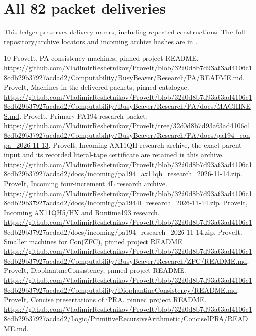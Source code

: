 \documentclass[10pt,letterpaper]{article}
\newcommand{\file}[1]{\path{#1}}
\begin{document}
\clearpage
\section{All 82 packet deliveries}
\label{app:packets}
This ledger preserves delivery names, including repeated constructions.
The full repository/archive locators and incoming archive hashes are in
\file{comparison/packets.csv}.


\clearpage
\begin{thebibliography}{10}
 ProveIt, PA consistency machines, pinned project README.
\url{https://github.com/VladimirReshetnikov/ProveIt/blob/32d0d8b7d93a63ad4106c18cdb29b37927acdad2/Computability/BusyBeaver/Research/PA/README.md}.
 ProveIt, Machines in the delivered packets, pinned catalogue.
\url{https://github.com/VladimirReshetnikov/ProveIt/blob/32d0d8b7d93a63ad4106c18cdb29b37927acdad2/Computability/BusyBeaver/Research/PA/docs/MACHINES.md}.
 ProveIt, Primary PA194 research packet.
\url{https://github.com/VladimirReshetnikov/ProveIt/tree/32d0d8b7d93a63ad4106c18cdb29b37927acdad2/Computability/BusyBeaver/Research/PA/docs/pa194_conpa_2026-11-13}.
 ProveIt, Incoming AX11QH research archive, the exact parent
input and its recorded literal-tape certificate are retained in this archive.
\url{https://github.com/VladimirReshetnikov/ProveIt/blob/32d0d8b7d93a63ad4106c18cdb29b37927acdad2/docs/incoming/pa194_ax11qh_research_2026-11-14.zip}.
 ProveIt, Incoming four-increment 4L research archive.
\url{https://github.com/VladimirReshetnikov/ProveIt/blob/32d0d8b7d93a63ad4106c18cdb29b37927acdad2/docs/incoming/pa1944l_research_2026-11-14.zip}.
 ProveIt, Incoming AX11QH5/HX and Runtime193 research.
\url{https://github.com/VladimirReshetnikov/ProveIt/blob/32d0d8b7d93a63ad4106c18cdb29b37927acdad2/docs/incoming/pa194_research_2026-11-14.zip}.
 ProveIt, Smaller machines for Con(ZFC), pinned project README.
\url{https://github.com/VladimirReshetnikov/ProveIt/blob/32d0d8b7d93a63ad4106c18cdb29b37927acdad2/Computability/BusyBeaver/Research/ZFC/README.md}.
 ProveIt, DiophantineConsistency, pinned project README.
\url{https://github.com/VladimirReshetnikov/ProveIt/blob/32d0d8b7d93a63ad4106c18cdb29b37927acdad2/Computability/DiophantineConsistency/README.md}.
 ProveIt, Concise presentations of iPRA, pinned project README.
\url{https://github.com/VladimirReshetnikov/ProveIt/blob/32d0d8b7d93a63ad4106c18cdb29b37927acdad2/Logic/PrimitiveRecursiveArithmetic/ConciseIPRA/README.md}.
\end{thebibliography}
\end{document}
